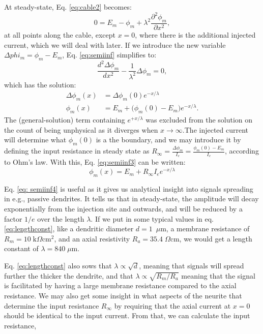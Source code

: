 At steady-state, Eq. \ref{eq:cable2} becomes:
\begin{equation}
0 = E_m-\phi_m +  \lambda^2 \frac{\partial^2 \phi_m}{\partial x^2}, 
\label{eq:semiinf}
\end{equation}
at all points along the cable, except $x=0$, where there is the additional injected current, which we will deal with later. If we introduce the new variable $\Delta{phi_m}=\phi_m-E_m$, Eq. \ref{eq:semiinf} simplifies to:
\begin{equation}
\frac{d^2 \Delta{\phi_m}}{d x^2} -  \frac{1}{\lambda^2} \Delta{\phi_m}=0, 
\label{eq:semiinf2}
\end{equation}
which has the solution:
\begin{align}
\Delta{\phi_m}(x) &= \Delta{\phi_m}(0) e^{-x/\lambda} \\
\phi_m(x) &= E_m + \big( \phi_m(0)-E_m \big) e^{-x/\lambda}.
\label{eq:semiinf3}
\end{align}
The (general-solution) term containing $e^{+x/\lambda}$ was excluded from the solution on the count of being unphysical as it diverges when $x \rightarrow \infty$.The injected current will determine what $\phi_m(0)$ is a the boundary, and we may introduce it by defining the input resistance in steady state as $R_{\infty} =  \frac{\Delta \phi_m}{I_e} =  \frac{\phi_m(0)-E_m}{I_e}$, according to Ohm's law. With this, Eq. \ref{eq:semiinf3} can be written:
\begin{equation}
\phi_m(x) = E_m + R_{\infty} I_e e^{-x/\lambda}
\label{eq:semiinf4}
\end{equation}

Eq. \ref{eq: semiinf4} is useful as it gives us analytical insight into signals spreading in e.g., passive dendrites. It tells us that in steady-state, the amplitude will decay exponentially from the injection site and outwards, and will be reduced by a factor $1/e$ over the length $\lambda$. If we put in some typical values in eq. \ref{eq:lengthconst}, like a dendritic diameter $d=1$~$\mu$m, a membrane resistance of $R_m=10\;\text{k}\Omega\text{cm}^2$, and an axial resistivity $R_a=35.4\;\Omega\text{cm}$, we would get a length constant of $\lambda = 840\; \mu$m. 

Eq. \ref{eq:lengthconst} also sows that $\lambda \propto \sqrt{d}$, meaning that signals will spread further the thicker the dendrite, and that $\lambda \propto \sqrt{R_m/R_a}$ meaning that the signal is facilitated by having a large membrane resistance compared to the axial resistance. We may also get some insight in what aspects of the neurite that determine the input resistance $R_{\infty}$ by requiring that the axial current at $x=0$ should be identical to the input current. From that, we can calculate the input resistance, 

